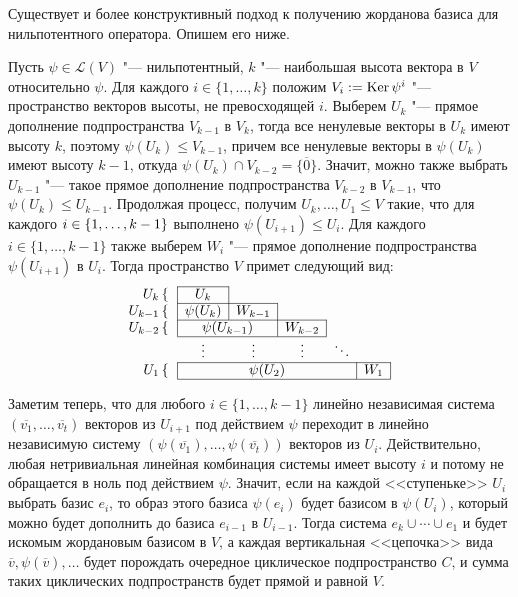 \begin{note}
	Существует и более конструктивный подход к получению жорданова базиса для нильпотентного оператора. Опишем его ниже.
	
	Пусть $\psi \in \mathcal{L}(V)$ "--- нильпотентный, $k$ "--- наибольшая высота вектора в $V$ относительно $\psi$. Для каждого $i \in \{1, \dotsc, k\}$ положим $V_i := \operatorname{Ker}\psi^i$ "--- пространство векторов высоты, не превосходящей $i$. Выберем $U_k$ "--- прямое дополнение  подпространства $V_{k - 1}$ в $V_k$, тогда все ненулевые векторы в $U_k$ имеют высоту $k$, поэтому $\psi(U_k) \le V_{k - 1}$, причем все ненулевые векторы в $\psi(U_k)$ имеют высоту $k - 1$, откуда $\psi(U_k) \cap V_{k - 2} = \{\overline{0}\}$. Значит, можно также выбрать $U_{k-1}$ "--- такое прямое дополнение подпространства $V_{k - 2}$ в $V_{k - 1}$, что $\psi(U_k) \le U_{k - 1}$. Продолжая процесс, получим $U_k, \dots, U_1 \le V$ такие, что для каждого $i \hm{\in} \{1, \dots, k - 1\}$ выполнено $\psi(U_{i+1}) \le U_i$. Для каждого $i \in \{1, \dots, k - 1\}$ также выберем $W_i$ "--- прямое дополнение подпространства $\psi(U_{i + 1})$ в $U_i$. Тогда пространство $V$ примет следующий вид:
	\[\begin{array}{@{}rccccc@{}}
		\cline{2-2}
		U_k \left\{\right.&\multicolumn{1}{|c|}{U_{k}} &&&&\\
		\cline{2-3}
		U_{k - 1} \left\{\right.&\multicolumn{1}{|c|}{\psi(U_k)} & \multicolumn{1}{c|}{W_{k - 1}} &&&\\
		\cline{2-4}
		U_{k - 2} \left\{\right.&\multicolumn{2}{|c|}{\psi(U_{k - 1})} & \multicolumn{1}{c|}{W_{k - 2}} &&\\
		\cline{2-4}
		&\vdots & \vdots & \vdots & \ddots &\\
		\cline{2-6}
		U_1 \left\{\right.&\multicolumn{4}{|c|}{\psi(U_2)} & \multicolumn{1}{c|}{W_1}\\
		\cline{2-6}
	\end{array}\]
	
	Заметим теперь, что для любого $i \in \{1, \dots, k - 1\}$ линейно независимая система $(\overline{v_1}, \dots, \overline{v_t})$ векторов из $U_{i+1}$ под действием $\psi$ переходит в линейно независимую систему $(\psi(\overline{v_1}), \dots, \psi(\overline{v_t}))$ векторов из $U_{i}$. Действительно, любая нетривиальная линейная комбинация системы имеет высоту $i$ и потому не обращается в ноль под действием $\psi$. Значит, если на каждой <<ступеньке>> $U_i$ выбрать базис $e_i$, то образ этого базиса $\psi(e_i)$ будет базисом в $\psi(U_i)$, который можно будет дополнить до базиса $e_{i - 1}$ в $U_{i - 1}$. Тогда система $e_k \cup \dotsb \cup e_1$ и будет искомым жордановым базисом в $V$, а каждая вертикальная <<цепочка>> вида $\overline{v}, \psi(\overline{v}), \dots$ будет порождать очередное циклическое подпространство $C$, и сумма таких циклических подпространств будет прямой и равной $V$.
\end{note}

